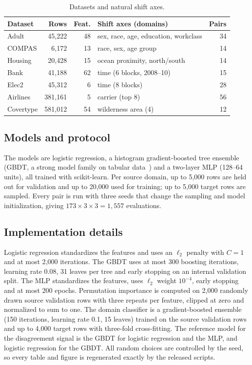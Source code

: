 \documentclass[conference]{IEEEtran}
\theoremstyle{plainhead}
\begin{document}
\begin{table}[t]
\centering
\caption{Datasets and natural shift axes.}
\label{tab:data}
\footnotesize
\setlength{\tabcolsep}{3pt}
\begin{tabular}{lrrlr}
\toprule
Dataset & Rows & Feat. & Shift axes (domains) & Pairs \\
\midrule
Adult & 45{,}222 & 48 & sex, race, age, education, workclass & 34 \\
COMPAS & 6{,}172 & 13 & race, sex, age group & 14 \\
Housing & 20{,}428 & 15 & ocean proximity, north/south & 14 \\
Bank & 41{,}188 & 62 & time (6 blocks, 2008--10) & 15 \\
Elec2 & 45{,}312 & 6 & time (8 blocks) & 28 \\
Airlines & 381{,}161 & 5 & carrier (top 8) & 56 \\
Covertype & 581{,}012 & 54 & wilderness area (4) & 12 \\
\bottomrule
\end{tabular}
\end{table}

\subsection{Models and protocol}
The models are logistic regression, a histogram gradient-boosted tree ensemble (GBDT, a strong model family on tabular data~\cite{mcelfresh2023neural}) and a two-layer MLP (128--64 units), all trained with scikit-learn. Per source domain, up to 5{,}000 rows are held out for validation and up to 20{,}000 used for training; up to 5{,}000 target rows are sampled. Every pair is run with three seeds that change the sampling and model initialization, giving $173\times3\times3 = 1{,}557$ evaluations.

\subsection{Implementation details}
Logistic regression standardizes the features and uses an $\ell_2$ penalty with $C=1$ and at most 2{,}000 iterations. The GBDT uses at most 300 boosting iterations, learning rate 0.08, 31 leaves per tree and early stopping on an internal validation split. The MLP standardizes the features, uses $\ell_2$ weight $10^{-4}$, early stopping and at most 200 epochs. Permutation importance is computed on 2{,}000 randomly drawn source validation rows with three repeats per feature, clipped at zero and normalized to sum to one. The domain classifier is a gradient-boosted ensemble (150 iterations, learning rate 0.1, 15 leaves) trained on the source validation rows and up to 4{,}000 target rows with three-fold cross-fitting. The reference model for the disagreement signal is the GBDT for logistic regression and the MLP, and logistic regression for the GBDT. All random choices are controlled by the seed, so every table and figure is regenerated exactly by the released scripts.
\end{document}
